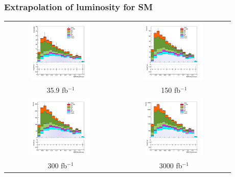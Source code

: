 \documentclass[11pt]{beamer}
\begin{document}
{\nologo
	\begin{frame}
	\frametitle{Extrapolation of luminosity for SM }
	\begin{center}
		\begin{tabular}{cc}
			\includegraphics[width=5.5cm,height=3cm]{figures/simple.png} &
			\includegraphics[width=5.5cm,height=3cm]{figures/150fb/simple-150.png}\\ 
			\scriptsize{35.9 fb$^{-1}$} & \scriptsize{150 fb$^{-1}$} \\
			\includegraphics[width=5.5cm,height=3cm]{figures/300fb/simple-300.png}&
			\includegraphics[width=5.5cm,height=3cm]{figures/3000fb/simple-3000.png}\\
			\scriptsize{300 fb$^{-1}$} & \scriptsize{3000 fb$^{-1}$} \\
		\end{tabular}
	\end{center}
\end{frame}
}
\end{document}
